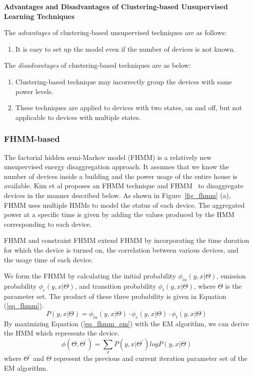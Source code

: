 \textbf{Advantages and Disadvantages of Clustering-based Unsupervised Learning Techniques}

The \textit{advantages} of clustering-based unsupervised techniques are as follows:
\begin{enumerate}
\item It is easy to set up the model even if the number of devices is 
not known.
\end{enumerate}

The \textit{disadvantages} of clustering-based techniques are as below:
\begin{enumerate}
\item Clustering-based technique may incorrectly group the devices with same power levels. 
\item These techniques are applied to devices with two states, on and off, but not applicable 
to devices with multiple states.  
\end{enumerate}

\subsubsection{FHMM-based}
The factorial hidden semi-Markov model (FHMM) is a relatively new unsupervised energy disaggregation approach. 
It assumes that we know the number of devices inside a building 
and the power usage of the entire house is available. 
Kim et al proposes an FHMM technique and FHMM~\cite{kim2011unsupervised} to disaggregate devices in the manner described below. 
As shown in Figure~\ref{fig_fhmm} (a),
FHMM uses multiple HMMs to model
the status of each device. 
The aggregated power at a specific time is given by adding the values produced by the HMM corresponding to each device.

FHMM and constraint FHMM
extend FHMM by incorporating the time duration for which the device is turned on, the
correlation between various devices, and the usage time of each device. 

We form the FHMM by calculating the initial probability $\phi_{in}(y,x|\Theta)$,
emission probability $\phi_{e}(y,x|\Theta)$, and
transition probability $\phi_{t}(y,x|\Theta)$,
where $\Theta$ is the parameter set.
The product of these three probability is given in Equation (\ref{eq_fhmm}).
\begin{equation}
\label{eq_fhmm}
P(y,x|\Theta)= \phi_{in}(y,x|\Theta) \cdot \phi_{e}(y,x|\Theta) \cdot \phi_{t}(y,x|\Theta)
\end{equation}
By maximizing Equation (\ref{eq_fhmm_em}) with the EM algorithm,
we can derive the HMM which represents the device. 
\begin{equation}
\label{eq_fhmm_em}
\phi(\Theta,\Theta^\prime)= \sum_x P(y,x|\Theta^\prime) log P(y,x|\Theta)
\end{equation}
where $\Theta^\prime $ and $\Theta$ represent the previous and current
iteration parameter set of the EM algorithm.

